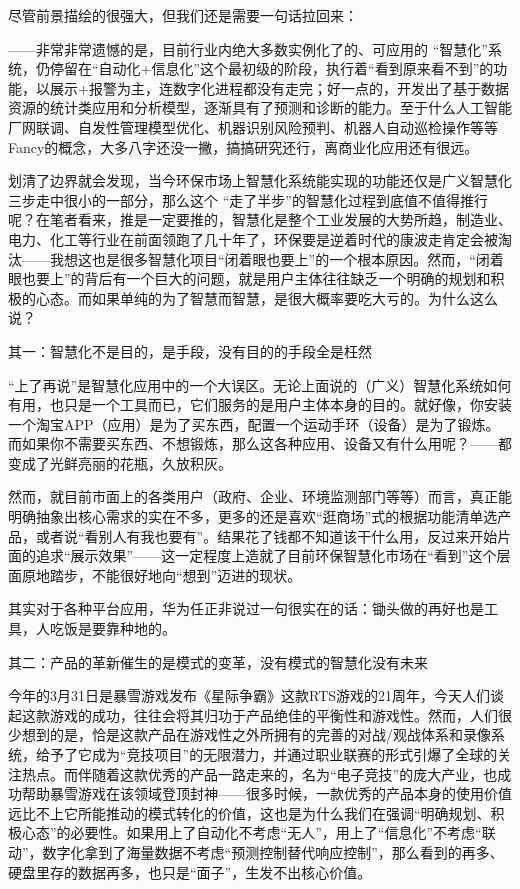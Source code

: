 \documentclass[]{book}
\begin{document}
尽管前景描绘的很强大，但我们还是需要一句话拉回来：

------非常非常遗憾的是，目前行业内绝大多数实例化了的、可应用的 ``智慧化''系统，仍停留在``自动化+信息化''这个最初级的阶段，执行着``看到原来看不到''的功能，以展示+报警为主，连数字化进程都没有走完；好一点的，开发出了基于数据资源的统计类应用和分析模型，逐渐具有了预测和诊断的能力。至于什么人工智能厂网联调、自发性管理模型优化、机器识别风险预判、机器人自动巡检操作等等Fancy的概念，大多八字还没一撇，搞搞研究还行，离商业化应用还有很远。

划清了边界就会发现，当今环保市场上智慧化系统能实现的功能还仅是广义智慧化三步走中很小的一部分，那么这个 ``走了半步''的智慧化过程到底值不值得推行呢？在笔者看来，推是一定要推的，智慧化是整个工业发展的大势所趋，制造业、电力、化工等行业在前面领跑了几十年了，环保要是逆着时代的康波走肯定会被淘汰------我想这也是很多智慧化项目``闭着眼也要上''的一个根本原因。然而，``闭着眼也要上''的背后有一个巨大的问题，就是用户主体往往缺乏一个明确的规划和积极的心态。而如果单纯的为了智慧而智慧，是很大概率要吃大亏的。为什么这么说？

其一：智慧化不是目的，是手段，没有目的的手段全是枉然

``上了再说''是智慧化应用中的一个大误区。无论上面说的（广义）智慧化系统如何有用，也只是一个工具而已，它们服务的是用户主体本身的目的。就好像，你安装一个淘宝APP（应用）是为了买东西，配置一个运动手环（设备）是为了锻炼。而如果你不需要买东西、不想锻炼，那么这各种应用、设备又有什么用呢？------都变成了光鲜亮丽的花瓶，久放积灰。

然而，就目前市面上的各类用户（政府、企业、环境监测部门等等）而言，真正能明确抽象出核心需求的实在不多，更多的还是喜欢``逛商场''式的根据功能清单选产品，或者说``看别人有我也要有''。结果花了钱都不知道该干什么用，反过来开始片面的追求``展示效果''------这一定程度上造就了目前环保智慧化市场在``看到''这个层面原地踏步，不能很好地向``想到''迈进的现状。

其实对于各种平台应用，华为任正非说过一句很实在的话：锄头做的再好也是工具，人吃饭是要靠种地的。

其二：产品的革新催生的是模式的变革，没有模式的智慧化没有未来

今年的3月31日是暴雪游戏发布《星际争霸》这款RTS游戏的21周年，今天人们谈起这款游戏的成功，往往会将其归功于产品绝佳的平衡性和游戏性。然而，人们很少想到的是，恰是这款产品在游戏性之外所拥有的完善的对战/观战体系和录像系统，给予了它成为``竞技项目''的无限潜力，并通过职业联赛的形式引爆了全球的关注热点。而伴随着这款优秀的产品一路走来的，名为``电子竞技''的庞大产业，也成功帮助暴雪游戏在该领域登顶封神------很多时候，一款优秀的产品本身的使用价值远比不上它所能推动的模式转化的价值，这也是为什么我们在强调``明确规划、积极心态''的必要性。如果用上了自动化不考虑``无人''，用上了``信息化''不考虑``联动''，数字化拿到了海量数据不考虑``预测控制替代响应控制''，那么看到的再多、硬盘里存的数据再多，也只是``面子''，生发不出核心价值。
\end{document}
